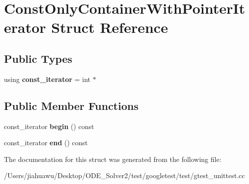 \hypertarget{struct_const_only_container_with_pointer_iterator}{}\section{Const\+Only\+Container\+With\+Pointer\+Iterator Struct Reference}
\label{struct_const_only_container_with_pointer_iterator}
\subsection*{Public Types}
\begin{DoxyCompactItemize}
\item 
\mbox{\label{struct_const_only_container_with_pointer_iterator_a652efbd2c6da61e65cc45123e4182713}} 
using {\bfseries const\+\_\+iterator} = int $\ast$
\end{DoxyCompactItemize}
\subsection*{Public Member Functions}
\begin{DoxyCompactItemize}
\item 
\mbox{\label{struct_const_only_container_with_pointer_iterator_a3dd48a5028ca3c3bed0a10d7c5fa938b}} 
const\+\_\+iterator {\bfseries begin} () const
\item 
\mbox{\label{struct_const_only_container_with_pointer_iterator_a041683280e1319a08467fa9035098cff}} 
const\+\_\+iterator {\bfseries end} () const
\end{DoxyCompactItemize}


The documentation for this struct was generated from the following file\+:\begin{DoxyCompactItemize}
\item 
/\+Users/jiahuawu/\+Desktop/\+O\+D\+E\+\_\+\+Solver2/test/googletest/test/gtest\+\_\+unittest.\+cc\end{DoxyCompactItemize}
